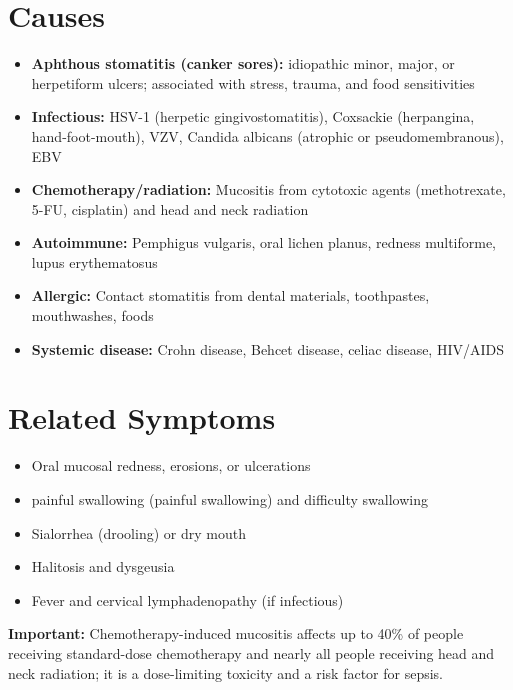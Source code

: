 \section*{Causes}
\begin{itemize}
  \item \textbf{Aphthous stomatitis (canker sores):} idiopathic minor, major, or herpetiform ulcers; associated with stress, trauma, and food sensitivities
  \item \textbf{Infectious:} HSV-1 (herpetic gingivostomatitis), Coxsackie (herpangina, hand-foot-mouth), VZV, Candida albicans (atrophic or pseudomembranous), EBV
  \item \textbf{Chemotherapy/radiation:} Mucositis from cytotoxic agents (methotrexate, 5-FU, cisplatin) and head and neck radiation
  \item \textbf{Autoimmune:} Pemphigus vulgaris, oral lichen planus, redness multiforme, lupus erythematosus
  \item \textbf{Allergic:} Contact stomatitis from dental materials, toothpastes, mouthwashes, foods
  \item \textbf{Systemic disease:} Crohn disease, Behcet disease, celiac disease, HIV/AIDS
\end{itemize}

\section*{Related Symptoms}
\begin{itemize}
  \item Oral mucosal redness, erosions, or ulcerations
  \item painful swallowing (painful swallowing) and difficulty swallowing
  \item Sialorrhea (drooling) or dry mouth
  \item Halitosis and dysgeusia
  \item Fever and cervical lymphadenopathy (if infectious)
\end{itemize}
\textbf{Important:} Chemotherapy-induced mucositis affects up to 40\% of people receiving standard-dose chemotherapy and nearly all people receiving head and neck radiation; it is a dose-limiting toxicity and a risk factor for sepsis.

